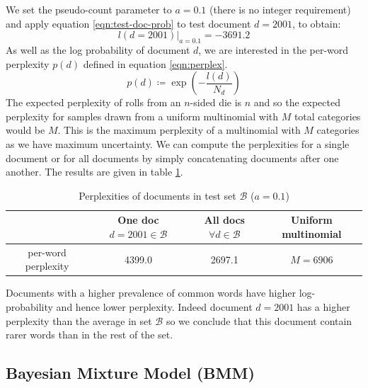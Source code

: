 \documentclass[]{article}
\newcommand{\Bcal}{\mathcal{B}}
\begin{document}
 We set the pseudo-count parameter to $a=0.1$ (there is no integer requirement) and apply equation \ref{eqn:test-doc-prob} to test document $d=2001$, to obtain:
 \begin{equation}
 	l(d=2001)|_{a=0.1} = -3691.2
 \end{equation}
 As well as the log probability of document $d$, we are interested in the per-word perplexity $p(d)$ defined in equation \ref{eqn:perplex}.
%
\begin{equation}
p(d) \coloneqq \exp \left(- \frac{l(d)}{N_d} \right)
\label{eqn:perplex}
\end{equation}
%
The expected perplexity of rolls from an $n$-sided die is $n$ and so the expected perplexity for samples drawn from a uniform multinomial with $M$ total categories would be $M$. This is the maximum perplexity of a multinomial with $M$ categories as we have maximum uncertainty. We can compute the perplexities for a single document or for all documents by simply concatenating documents after one another. The results are given in table \ref{tab:perplex}.
%
\begin{table}[!h]
	\centering
	\begin{tabular}{c | c c c}
		& One doc $d=2001 \in \Bcal$ & All docs $\forall d \in \Bcal$ & Uniform multinomial \\ \hline
		per-word perplexity & 4399.0 & 2697.1 & $M=6906$
	\end{tabular}
\caption{Perplexities of documents in test set $\Bcal$ ($a=0.1$)}
\label{tab:perplex}
\end{table}
%
Documents with a higher prevalence of common words have higher log-probability and hence lower perplexity. Indeed document $d=2001$ has a higher perplexity than the average in set $\Bcal$ so we conclude that this document contain rarer words than in the rest of the set.

\subsection{Bayesian Mixture Model (BMM)}
\end{document}
